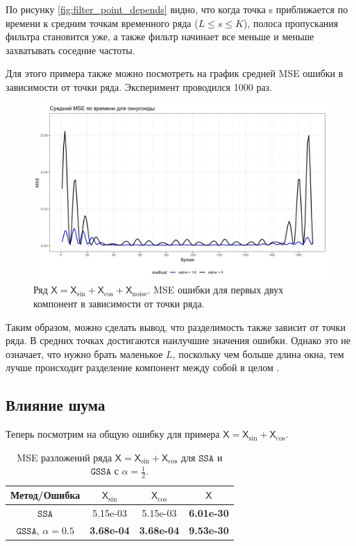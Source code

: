 \documentclass[12pt, specialist, subf
]{disser}
\theoremstyle{definition}
\newcommand{\SSA}{\texttt{SSA}}
\newcommand{\GSSA}{\texttt{GSSA}}
\newcommand{\TS}{\mathsf{X}}
\begin{document}
По рисунку \ref{fig:filter_point_depends} видно, что когда точка s приближается по времени к средним точкам временного ряда ($L \leq s \leq K$), полоса пропускания фильтра становится уже, а также фильтр начинает все меньше и меньше захватывать соседние частоты.

Для этого примера также можно посмотреть на график средней MSE ошибки в зависимости от точки ряда. Эксперимент проводился 1000 раз.
\begin{figure}[H]
	\centering
	\includegraphics[width=1\textwidth]{img/mse_y1_time.png}
	\caption{Ряд $\TS = \TS_{\sin} + \TS_{\cos}+ \TS_{\mathrm{noise}}$. MSE ошибки для первых двух компонент в зависимости от точки ряда.}
	\label{fig:mse_filter_point_depends}
\end{figure}

Таким образом, можно сделать вывод, что разделимость также зависит от точки ряда. В средних точках достигаются наилучшие значения ошибки. Однако это не означает, что нужно брать маленькое $L$, поскольку чем больше длина окна, тем лучше происходит разделение компонент между собой в целом \cite{golyandina2001analysis}.











\subsection{Влияние шума}

Теперь посмотрим на общую ошибку для примера $\TS = \TS_{\sin} + \TS_{\cos}$.

\begin{table}[H]
	\caption{MSE разложений ряда $\TS = \TS_{\sin} + \TS_{\cos}$ для $\SSA$ и $\GSSA$ с $\alpha = \frac{1}{2}$.}
	\centering
	\begin{tabular}{c|ccc}
		\hline
		Метод/Ошибка                  & $\TS_{\sin}$      & $\TS_{\cos}$      & $\TS$             \\
		\hline
		$\SSA$                  & 5.15e-03          & 5.15e-03          & \textbf{6.01e-30} \\
		$\GSSA$, $\alpha = 0.5$ & \textbf{3.68e-04} & \textbf{3.68e-04} & \textbf{9.53e-30} \\
		\hline
	\end{tabular}

	\label{tab:mse_ssa_gssa}
\end{table}
\end{document}

